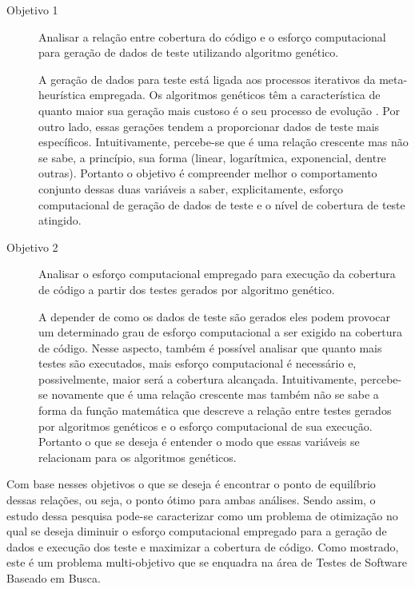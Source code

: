\makeatletter
\def\namedlabel#1#2{\begingroup
    #2%
    \def\@currentlabel{#2}%
    \label{#1}\endgroup
}
\begin{description}
\item[\namedlabel{obj1}{Objetivo 1}] Analisar a relação entre cobertura do código e o esforço computacional para geração de dados de teste utilizando algoritmo genético.

A geração de dados para teste está ligada aos processos iterativos da meta-heurística empregada. Os algoritmos genéticos têm a característica de quanto maior sua geração mais custoso é o seu processo de evolução \cite{pargas1999test}. Por outro lado, essas gerações tendem a proporcionar dados de teste mais específicos. Intuitivamente, percebe-se que é uma relação crescente mas não se sabe, a princípio, sua forma (linear, logarítmica, exponencial, dentre outras). Portanto o objetivo é compreender melhor o comportamento conjunto dessas duas variáveis a saber, explicitamente, esforço computacional de geração de dados de teste e o  nível de cobertura de teste atingido. 
		

\item[\namedlabel{obj2}{Objetivo 2}] Analisar o esforço computacional empregado para execução da cobertura de código a partir dos testes gerados por algoritmo genético.

A depender de como os dados de teste são gerados eles podem provocar um determinado grau de esforço computacional a ser exigido na cobertura de código.  Nesse aspecto, também é possível analisar que quanto mais testes são executados, mais esforço computacional é necessário e, possivelmente, maior será a cobertura alcançada. Intuitivamente, percebe-se novamente que é uma relação crescente mas também não se sabe a forma da função matemática que descreve a relação entre testes gerados por algoritmos genéticos e o esforço computacional de sua execução. Portanto o que se deseja é entender o modo que essas variáveis se relacionam para os algoritmos genéticos.

\end{description}

Com base nesses objetivos o que se deseja é encontrar o ponto de equilíbrio dessas relações, ou seja,  o ponto ótimo para ambas análises. Sendo assim,  o estudo dessa pesquisa pode-se caracterizar como um problema de otimização no qual se deseja diminuir o esforço computacional empregado para a geração de dados e execução dos teste e maximizar a cobertura de código. Como mostrado, este é um problema multi-objetivo que se enquadra na área de Testes de Software Baseado em Busca.



